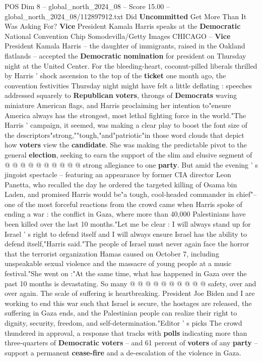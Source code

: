 \begin{textsample}{POS Dim 8 – global\_north\_2024\_08 – Score 15.00 – global\_north\_2024\_08/112897912.txt}  \label{ex:f8_pos_035}
Did \textbf{Uncommitted} Get More Than It Was Asking For? \textbf{Vice} President Kamala Harris speaks at the \textbf{Democratic} National Convention Chip Somodevilla/Getty Images CHICAGO -- \textbf{Vice} President Kamala Harris -- the daughter of immigrants, raised in the Oakland flatlands -- accepted the \textbf{Democratic} \textbf{nomination} for president on Thursday night at the United Center.
For the bleeding-heart, coconut-pilled liberals thrilled by Harris ' shock ascension to the top of the \textbf{ticket} one month ago, the convention festivities Thursday night might have felt a little deflating : speeches addressed squarely to \textbf{Republican} \textbf{voters}, throngs of \textbf{Democrats} waving miniature American flags, and Harris proclaiming her intention to"ensure America always has the strongest, most lethal fighting force in the world."The Harris ' campaign, it seemed, was making a clear play to boost the font size of the descriptors"strong,""tough,"and"patriotic"in those word clouds that depict how \textbf{voters} view the \textbf{candidate}.
She was making the predictable pivot to the general \textbf{election}, seeking to earn the support of the slim and elusive segment of @ @ @ @ @ @ @ @ @ @ strong allegiance to one \textbf{party}.
But amid the evening ' s jingoist spectacle -- featuring an appearance by former CIA director Leon Panetta, who recalled the day he ordered the targeted killing of Osama bin Laden, and promised Harris would be"a tough, cool-headed commander in chief"-- one of the most forceful reactions from the crowd came when Harris spoke of ending a war : the conflict in Gaza, where more than 40,000 Palestinians have been killed over the last 10 months."Let me be clear : I will always stand up for Israel ' s right to defend itself and I will always ensure Israel has the ability to defend itself,"Harris said."The people of Israel must never again face the horror that the terrorist organization Hamas caused on October 7, including unspeakable sexual violence and the massacre of young people at a music festival."She went on :"At the same time, what has happened in Gaza over the past 10 months is devastating.
So many @ @ @ @ @ @ @ @ @ @ safety, over and over again.
The scale of suffering is heartbreaking.
President Joe Biden and I are working to end this war such that Israel is secure, the hostages are released, the suffering in Gaza ends, and the Palestinian people can realize their right to dignity, security, freedom, and self-determination."Editor ' s picks The crowd thundered in approval, a response that tracks with \textbf{polls} indicating more than three-quarters of \textbf{Democratic} \textbf{voters} -- and 61 percent of \textbf{voters} of any \textbf{party} -- support a permanent \textbf{cease-fire} and a de-escalation of the violence in Gaza.

\end{textsample}
